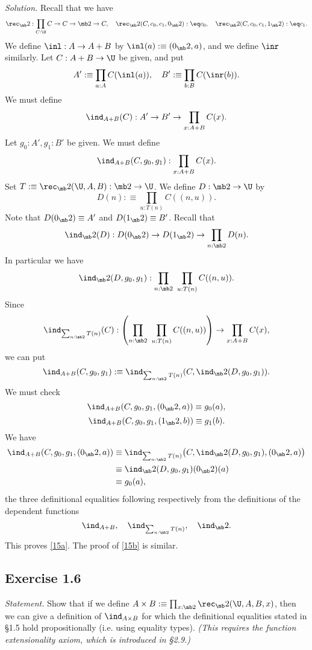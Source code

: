 \documentclass[12pt]{article}
\begin{document}
\nn\emph{Solution.} Recall that we have 
$$
\rec_\mb2:\prod_{C:\U}C\to C\to\mb2\to C,\quad\rec_\mb2(C,c_0,c_1,0_\mb2):\eq c_0,\quad\rec_\mb2(C,c_0,c_1,1_\mb2):\eq c_1.
$$
We define $\inl:A\to A+B$ by $\inl(a):\equiv(0_\mb2,a)$, and we define $\inr$ similarly. Let $C:A+B\to\U$ be given, and put 
$$
A':\equiv\prod_{a:A}C(\inl(a)),\quad B':\equiv\prod_{b:B}C(\inr(b)).
$$
We must define 
$$
\ind_{A+B}(C):A'\to B'\to\prod_{x:A+B}C(x).
$$ 
Let $g_0:A',g_1:B'$ be given. We must define 
$$
\ind_{A+B}(C,g_0,g_1):\prod_{x:A+B}C(x).
$$ 
Set $T:\equiv\rec_\mb2(\U,A,B):\mb2\to\U$. We define $D:\mb2\to\U$ by 
$$
D(n):\equiv\prod_{u:T(n)}C((n,u)).
$$ 
Note that $D(0_\mb2)\equiv A'$ and $D(1_\mb2)\equiv B'$. Recall that 
$$
\ind_\mb2(D):D(0_\mb2)\to D(1_\mb2)\to\prod_{n:\mb2}D(n).
$$ 
In particular we have 
$$
\ind_\mb2(D,g_0,g_1):\prod_{n:\mb2}\ \prod_{u:T(n)}C((n,u)).
$$ 
Since 
$$
\ind_{\sum_{n:\mb2}T(n)}(C):\left(\prod_{n:\mb2}\ \prod_{u:T(n)}C((n,u))\right)\to\prod_{x:A+B}C(x),
$$ 
we can put 
$$
\ind_{A+B}(C,g_0,g_1):\equiv\ind_{\sum_{n:\mb2}T(n)}(C,\ind_\mb2(D,g_0,g_1)).
$$ 
We must check 
\begin{equation}\label{15a}
\ind_{A+B}(C,g_0,g_1,(0_\mb2,a))\equiv g_0(a),
\end{equation}
\begin{equation}\label{15b}
\ind_{A+B}(C,g_0,g_1,(1_\mb2,b))\equiv g_1(b).
\end{equation} 
We have 
\begin{align*}
\ind_{A+B}(C,g_0,g_1,(0_\mb2,a))&\equiv\ind_{\sum_{n:\mb2}T(n)}\big(C,\ind_\mb2(D,g_0,g_1),(0_\mb2,a)\big)\\ 
&\equiv\ind_\mb2(D,g_0,g_1)(0_\mb2)(a)\\ 
&\equiv g_0(a),
\end{align*}
the three definitional equalities following respectively from the definitions of the dependent functions
$$
\ind_{A+B},\quad\ind_{\sum_{n:\mb2}T(n)},\quad\ind_\mb2.
$$ 
This proves \eqref{15a}. The proof of \eqref{15b} is similar.


\subsection{Exercise 1.6}

\emph{Statement.} Show that if we define $A\times B:\equiv\prod_{x:\mb2}\rec_\mb2(\U,A,B,x)$, then we can give a definition of  $\ind_{A\times B}$ for which the definitional equalities stated in \S1.5 hold propositionally (i.e. using equality types). \emph{(This requires the function extensionality axiom, which is introduced in \S2.9.)}
\end{document}
